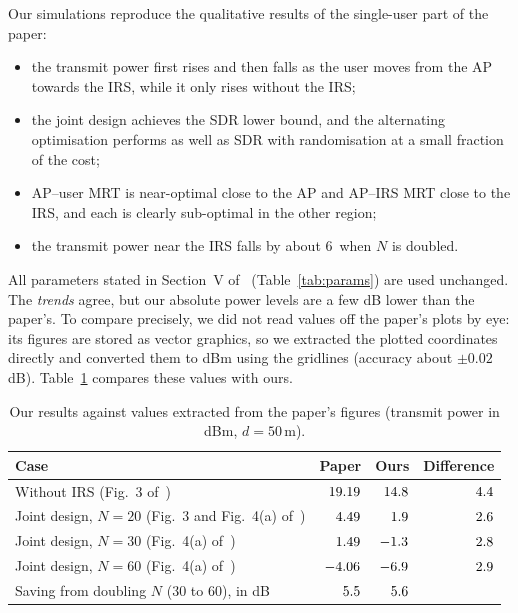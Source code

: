\documentclass[11pt,a4paper]{article}
\newcommand{\udB}{\,\text{dB}}
\begin{document}
Our simulations reproduce the qualitative results of the single-user part of the paper:
\begin{itemize}[leftmargin=1.4em,itemsep=2pt]
\item the transmit power first rises and then falls as the user moves from the AP towards the IRS,
while it only rises without the IRS;
\item the joint design achieves the SDR lower bound, and the alternating optimisation performs as well
as SDR with randomisation at a small fraction of the cost;
\item AP--user MRT is near-optimal close to the AP and AP--IRS MRT close to the IRS, and each is
clearly sub-optimal in the other region;
\item the transmit power near the IRS falls by about 6\udB{} when $N$ is doubled.
\end{itemize}

All parameters stated in Section~V of~\cite{wu} (Table~\ref{tab:params}) are used unchanged. The
\emph{trends} agree, but our absolute power levels are a few dB lower than the paper's. To compare
precisely, we did not read values off the paper's plots by eye: its figures are stored as vector
graphics, so we extracted the plotted coordinates directly and converted them to dBm using the
gridlines (accuracy about $\pm0.02$\,dB). Table~\ref{tab:vspaper} compares these values with ours.

\begin{table}[H]
\centering
\caption{Our results against values extracted from the paper's figures (transmit power in dBm, $d=50$\,m).}
\label{tab:vspaper}
\begin{tabular}{lrrr}
\toprule
Case & Paper & Ours & Difference \\
\midrule
Without IRS (Fig.~3 of~\cite{wu}) & $19.19$ & $14.8$ & $4.4$ \\
Joint design, $N=20$ (Fig.~3 and Fig.~4(a) of~\cite{wu}) & $4.49$ & $1.9$ & $2.6$ \\
Joint design, $N=30$ (Fig.~4(a) of~\cite{wu}) & $1.49$ & $-1.3$ & $2.8$ \\
Joint design, $N=60$ (Fig.~4(a) of~\cite{wu}) & $-4.06$ & $-6.9$ & $2.9$ \\
Saving from doubling $N$ (30 to 60), in dB & $5.5$ & $5.6$ & \\
\bottomrule
\end{tabular}
\end{table}
\end{document}
